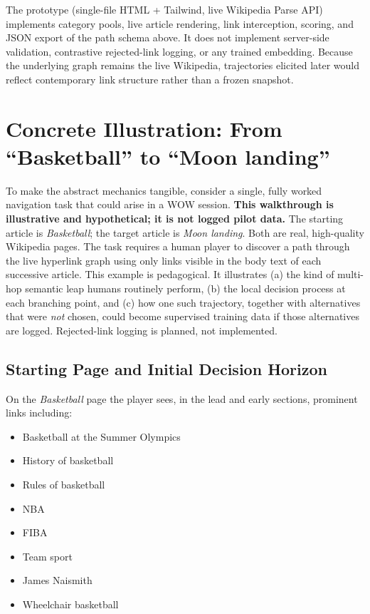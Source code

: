 \documentclass[11pt,a4paper]{report}
\begin{document}
The prototype (single-file HTML + Tailwind, live Wikipedia Parse API) implements category pools, live article rendering, link interception, scoring, and JSON export of the path schema above. It does not implement server-side validation, contrastive rejected-link logging, or any trained embedding. Because the underlying graph remains the live Wikipedia, trajectories elicited later would reflect contemporary link structure rather than a frozen snapshot.

\section{Concrete Illustration: From ``Basketball'' to ``Moon landing''}

To make the abstract mechanics tangible, consider a single, fully worked navigation task that could arise in a WOW session. \textbf{This walkthrough is illustrative and hypothetical; it is not logged pilot data.} The starting article is \textit{Basketball}; the target article is \textit{Moon landing}. Both are real, high-quality Wikipedia pages. The task requires a human player to discover a path through the live hyperlink graph using only links visible in the body text of each successive article. This example is pedagogical. It illustrates (a) the kind of multi-hop semantic leap humans routinely perform, (b) the local decision process at each branching point, and (c) how one such trajectory, together with alternatives that were \textit{not} chosen, could become supervised training data if those alternatives are logged. Rejected-link logging is planned, not implemented.

\subsection{Starting Page and Initial Decision Horizon}

On the \textit{Basketball} page the player sees, in the lead and early sections, prominent links including:
\begin{itemize}
    \item Basketball at the Summer Olympics
    \item History of basketball
    \item Rules of basketball
    \item NBA
    \item FIBA
    \item Team sport
    \item James Naismith
    \item Wheelchair basketball
\end{itemize}
\end{document}
